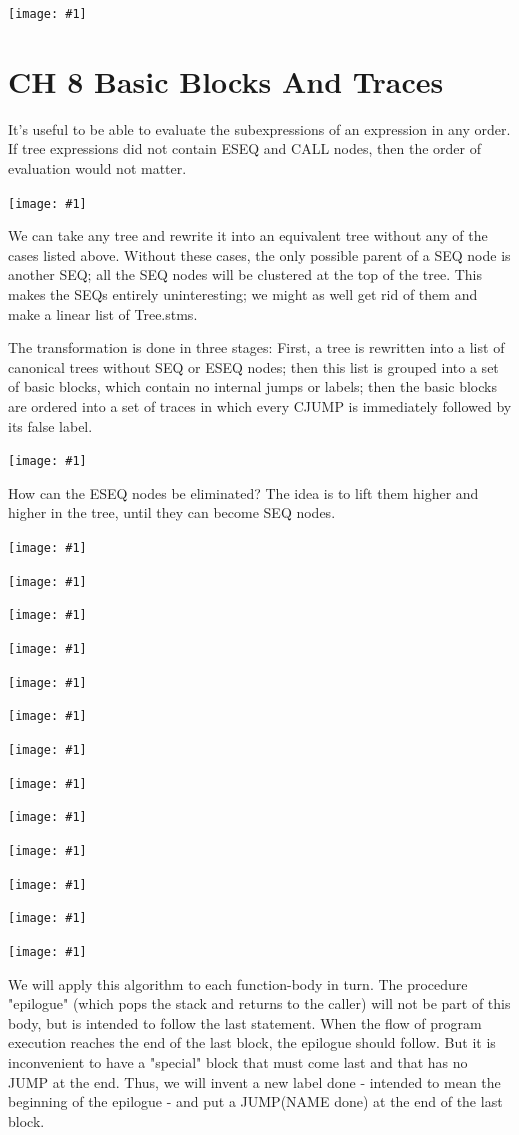 \documentclass[8pt, a4paper, oneside, twocolumn]{extarticle}
\newcommand{\ph}[1]{
    \texttt{[image: \#1]}
}
\begin{document}
\ph{ir9}

\section{CH 8 Basic Blocks And Traces}
It's useful to be able to evaluate the subexpressions of an 
expression in any order. If tree expressions did not contain ESEQ and CALL nodes,
then the order of evaluation would not matter.

\ph{81}

We can take any tree and rewrite it into an equivalent tree without any of
the cases listed above. Without these cases, the only possible parent of a SEQ
node is another SEQ; all the SEQ nodes will be clustered at the top of the tree.
This makes the SEQs entirely uninteresting; we might as well get rid of them
and make a linear list of Tree.stms.

The transformation is done in three stages: First, a tree is rewritten into a
list of canonical trees without SEQ or ESEQ nodes; then this list is grouped
into a set of basic blocks, which contain no internal jumps or labels; then
the basic blocks are ordered into a set of traces in which every CJUMP is
immediately followed by its false label.

\ph{82}

How can the ESEQ nodes be eliminated? The idea is to lift them higher and
higher in the tree, until they can become SEQ nodes.

\ph{83}

\ph{84}

\ph{85}

\ph{86}

\ph{87}

\ph{88}

\ph{89}

\ph{811}

\ph{812}

\ph{813}

\ph{814}

\ph{815}

\ph{816}

We will apply this algorithm to each function-body in turn. The procedure
"epilogue" (which pops the stack and returns to the caller) will not be part of
this body, but is intended to follow the last statement. When the flow of 
program execution reaches the end of the last block, the epilogue should follow.
But it is inconvenient to have a "special" block that must come last and that
has no JUMP at the end. Thus, we will invent a new label done - intended
to mean the beginning of the epilogue - and put a JUMP(NAME done) at the
end of the last block.
\end{document}
